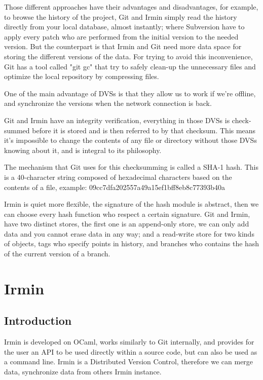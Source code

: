 \documentclass[10pt,a4paper]{report}
\begin{document}
Those different approaches have their advantages and disadvantages, for example, to browse the history of the project, Git and Irmin simply read the history directly from your local database, almost instantly; where Subversion have to apply every patch who are performed from the initial version to the needed version. But the counterpart is that Irmin and Git need more data space for storing the different versions of the data. For trying to avoid this inconvenience, Git has a tool called "git gc" that try to safely clean-up the unnecessary files and optimize the local repository by compressing files.\newline

One of the main advantage of DVSs is that they allow us to work if we're offline, and synchronize the versions when the network connection is back.\newline

Git and Irmin have an integrity verification, everything in those DVSs is check-summed before it is stored and is then referred to by that checksum. This means it's impossible to change the contents of any file or directory without those DVSs knowing about it, and is integral to its philosophy. \newline

The mechanism that Git uses for this checksumming is called a SHA-1 hash. This is a 40-character string composed of hexadecimal characters  based on the contents of a file, example: 09cc7dfa202557a49a15ef1bff8eb8c77393b40a\newline

Irmin is quiet more flexible, the signature of the hash module is abstract, then we can choose every hash function who respect a certain signature.
Git and Irmin, have two distinct stores, the first one is an append-only store, we can only add data and you cannot erase data in any way; and a read-write store for two kinds of objects, tags who specify points in history, and branches who contains the hash of the current version of a branch.\newline

\chapter{Irmin}

\section{Introduction}
Irmin is developed on OCaml, works similarly to Git internally, and provides for the user an API to be used directly within a source code, but can also be used as a command line. 
Irmin is a Distributed Version Control, therefore we can merge data, synchronize data from others Irmin instance. \newline
\end{document}
